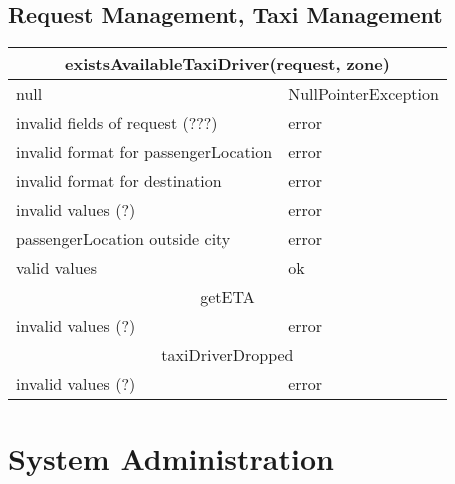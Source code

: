 \documentclass[11pt,oneside,a4paper]{report}
\begin{document}
\section{Request Management, Taxi Management}
\begin{tabular}{p{5cm}|p{6cm}}
\hline
	\multicolumn{2}{c}{existsAvailableTaxiDriver(request, zone)}\\\hline
	null &
	NullPointerException \\\hline
	invalid fields of request (???) &
	error \\\hline
	invalid format for passengerLocation &
	error \\\hline
	invalid format for destination &
	error \\\hline
	invalid values (?) &
	error \\\hline
	passengerLocation outside city &
	error \\\hline
	valid values &
	ok \\\hline\hline
	
	\multicolumn{2}{c}{getETA}\\\hline
	invalid values (?) &
	error \\\hline\hline

	\multicolumn{2}{c}{taxiDriverDropped}\\\hline
	invalid values (?) &
	error \\\hline
\end{tabular}


\chapter{System Administration}
\end{document}
